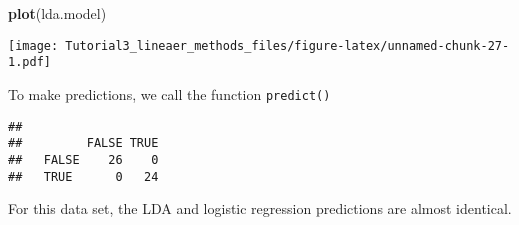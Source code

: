 \documentclass[]{article}
\newenvironment{Shaded}{\begin{snugshade}}{\end{snugshade}}
\newcommand{\KeywordTok}[1]{\textcolor[rgb]{0.13,0.29,0.53}{\textbf{#1}}}
\newcommand{\StringTok}[1]{\textcolor[rgb]{0.31,0.60,0.02}{#1}}
\newcommand{\OperatorTok}[1]{\textcolor[rgb]{0.81,0.36,0.00}{\textbf{#1}}}
\newcommand{\NormalTok}[1]{#1}
\begin{document}
\begin{Shaded}
\begin{Highlighting}[]
\KeywordTok{plot}\NormalTok{(lda.model)}
\end{Highlighting}
\end{Shaded}

\texttt{[image: Tutorial3\_lineaer\_methods\_files/figure-latex/unnamed-chunk-27-1.pdf]}

To make predictions, we call the function \texttt{predict()}

\begin{Shaded}
\end{Shaded}

\begin{verbatim}
##        
##         FALSE TRUE
##   FALSE    26    0
##   TRUE      0   24
\end{verbatim}

For this data set, the LDA and logistic regression predictions are
almost identical.
\end{document}
